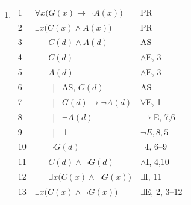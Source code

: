 \documentclass{article}
\newcommand{\asbar}{\ | \ }
\begin{document}
\begin{enumerate}
    \item %
          \begin{tabular}{l|p{8cm}l}
              \hline
              1  & $\forall x\big(G(x)\to\neg A(x)\big)$          & PR                   \\
              2  & $\exists x\big(C(x)\land A(x)\big)$            & PR                   \\
              3  & \asbar $C(d)\land A(d)$                        & AS                   \\
              4  & \asbar $C(d)$                                  & $\land$E, 3          \\
              5  & \asbar $A(d)$                                  & $\land$E, 3          \\
              6  & \asbar \asbar AS, $G(d)$                       & AS                   \\
              7  & \asbar \asbar $G(d)\to\neg A(d)$               & $\forall$E, 1        \\
              8  & \asbar \asbar $\neg A(d)$                      & $\to$E, 7,6          \\
              9  & \asbar \asbar $\bot$                           & $\neg E, 8,5$        \\
              10 & \asbar $\neg G(d)$                             & $\neg$I, 6--9        \\
              11 & \asbar $C(d)\land\neg G(d)$                    & $\land$I, 4,10       \\
              12 & \asbar $\exists x\big(C(x)\land\neg G(x)\big)$ & $\exists$I, 11       \\
              13 & $\exists x\big(C(x)\land\neg G(x)\big)$        & $\exists$E, 2, 3--12 \\
              \hline
          \end{tabular}

          \vspace{6pt}


\end{enumerate}
\end{document}

